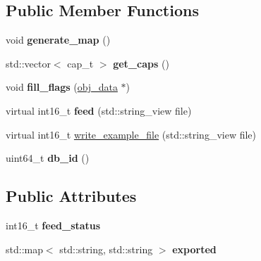 \subsection*{Public Member Functions}
\begin{DoxyCompactItemize}
\item 
\mbox{\label{structmods_1_1yaml_1_1consumable__description__t_a6125f4f454465df82a3799a6ca13b09e}} 
void {\bfseries generate\+\_\+map} ()
\item 
\mbox{\label{structmods_1_1yaml_1_1consumable__description__t_a781ca3baf0e52171b112df68707024fe}} 
std\+::vector$<$ cap\+\_\+t $>$ {\bfseries get\+\_\+caps} ()
\item 
\mbox{\label{structmods_1_1yaml_1_1consumable__description__t_a0d81362efa2aacd00dbb8d080325d6ca}} 
void {\bfseries fill\+\_\+flags} (\hyperlink{structobj__data}{obj\+\_\+data} $\ast$)
\item 
\mbox{\label{structmods_1_1yaml_1_1consumable__description__t_a0c46c22b212e21089912dfc5da8fd5fa}} 
virtual int16\+\_\+t {\bfseries feed} (std\+::string\+\_\+view file)
\item 
virtual int16\+\_\+t \hyperlink{structmods_1_1yaml_1_1consumable__description__t_a803c6d4b65a1cba30a5917cd397e2881}{write\+\_\+example\+\_\+file} (std\+::string\+\_\+view file)
\item 
\mbox{\label{structmods_1_1yaml_1_1consumable__description__t_aa6aa87dda7073599d6c1ec2d9bbe465a}} 
uint64\+\_\+t {\bfseries db\+\_\+id} ()
\end{DoxyCompactItemize}
\subsection*{Public Attributes}
\begin{DoxyCompactItemize}
\item 
\mbox{\label{structmods_1_1yaml_1_1consumable__description__t_a6835a2ee849679527ae5fd04e0ba444d}} 
int16\+\_\+t {\bfseries feed\+\_\+status}
\item 
\mbox{\label{structmods_1_1yaml_1_1consumable__description__t_ac426824bb6192a96555a3c1130c8eebb}} 
std\+::map$<$ std\+::string, std\+::string $>$ {\bfseries exported}
\end{DoxyCompactItemize}


